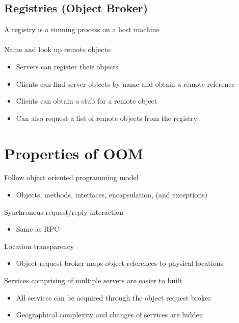 \documentclass{article}[18pt]
\begin{document}
\subsection{Registries (Object Broker)}
A registry is a running process on a host machine\\
\\
Name and look up remote objects:
\begin{itemize}
	\item Servers can register their objects
	\item Clients can find server objects by name and obtain a remote reference
	\item Clients can obtain a stub for a remote object
	\item Can also request a list of remote objects from the registry
\end{itemize}
\section{Properties of OOM}
Follow object oriented programming model
\begin{itemize}
	\item Objects, methods, interfaces, encapsulation, (and exceptions)
\end{itemize}
Synchronous request/reply interaction
\begin{itemize}
	\item Same as RPC
\end{itemize}
Location transparency
\begin{itemize}
	\item Object request broker maps object references to physical locations
\end{itemize}
Services comprising of multiple servers are easier to built
\begin{itemize}
	\item All services can be acquired through the object request broker
	\item Geographical complexity and changes of services are hidden
\end{itemize}
\end{document}
